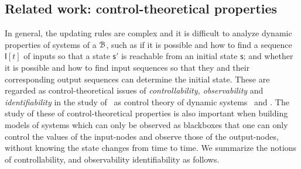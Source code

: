 

\subsection{Related work: control-theoretical properties}
 In general, the updating rules are complex and it is difficult to analyze dynamic properties of systems of a {\BCN} ${\mathcal{B}}$, such as if it is possible and how to  find a sequence $\mathsf{I}[t]$ of inputs so that a state $\mathsf{s}'$ is reachable from an initial state $\mathsf{s}$;  and whether it is possible and how to find input sequences so that  they and their corresponding output sequences can  determine the initial state.  These are regarded as control-theoretical issues of {\em controllability, observability} and {\em identifiability} in the study of \BCNs\ as  control theory of dynamic systems~\cite{Akutsu2007Control,cheng2009controllability, Zhao2010Input, Cheng2011Identification, Cheng2011Analysis} and \cite{Fornasini2013Observability}.
The study  of these of control-theoretical properties is also important when building {\BCN} models of systems which can only be observed as blackboxes that one can only  control the  values of  the input-nodes and observe those of the output-nodes, without knowing  the state changes  from time to time.   We summarize  the notions of controllability, and observability identifiability as follows.
  
